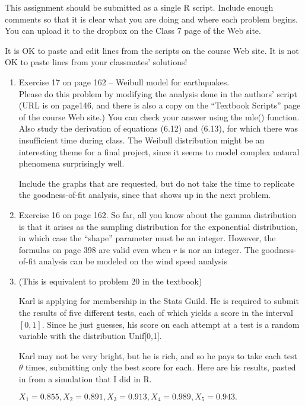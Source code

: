 \documentclass[12pt]{article}
\begin{document}
This assignment should be submitted as a single R script. Include enough comments so that it is clear what you are doing and where each problem begins. You can upload it to the dropbox on the Class 7 page of the Web site. 

It is OK to paste and edit lines from the scripts on the course Web site. It is not OK to paste lines from your classmates' solutions!

\begin{enumerate}
\item Exercise 17 on page 162 -- Weibull model for earthquakes.\\
 Please do this problem  by modifying the analysis done in the authors' script (URL is on page146, and there is also a copy on the ``Textbook Scripts'' page of the course Web site.) You can check your answer using the mle() function. Also study the derivation of equations (6.12) and (6.13), for which there was insufficient time during class. The Weibull distribution might be an interesting theme for a final project, since it seems to model complex natural phenomena surprisingly well.

Include the graphs that are requested, but do not take the time to replicate the goodness-of-fit analysis, since that shows up in the next problem.

\item Exercise 16 on page 162. So far, all you know about the gamma distribution is that it arises as the sampling distribution for the exponential distribution, in which case the ``shape'' parameter must be an integer. However, the formulas on page 398 are valid even when $r$ is nor an integer. The goodness-of-fit analysis can be modeled on the wind speed analysis


\item (This is equivalent to problem 20 in the textbook)


Karl is applying for membership in the Stats Guild. He is required to submit the results of five different tests, each of which yields a score in the interval $[0,1].$ Since he just guesses, his score on each attempt at a test is a random variable with the distribution Unif[0,1].

Karl may not be very bright, but he is rich, and so he pays to take each test $\theta$ times, submitting only the best score for each.  Here are his results, pasted in from a simulation that I did in R.

$X_1 = 0.855,  X_2 =0.891, X_3 = 0.913, X_4 = 0.989, X_5 = 0.943.$


\end{enumerate}
\end{document}
